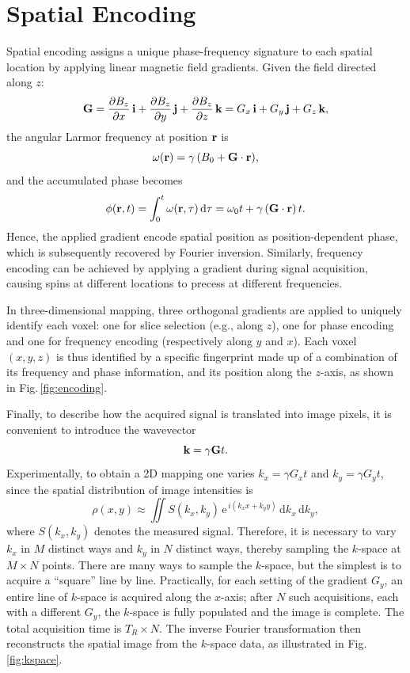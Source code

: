 \section{Spatial Encoding}
Spatial encoding assigns a unique phase-frequency signature to each spatial location by applying linear magnetic field gradients. Given the field  directed along $z$:
\begin{equation}
    \mathbf{G} = \frac{\partial B_z}{\partial x}\,\mathbf{i} + \frac{\partial B_z}{\partial y}\,\mathbf{j} + \frac{\partial B_z}{\partial z}\,\mathbf{k} = G_x\,\mathbf{i}+G_y\,\mathbf{j}+G_z\,\mathbf{k},
\end{equation}
the angular Larmor frequency at position $\mathbf{r}$ is
\begin{equation}
    \omega(\vect{r})=\gamma\,\left(B_0+\vect{G}\cdot\vect{r}\right),
\end{equation}
and the accumulated phase becomes
\begin{equation}
    \phi(\vect{r},t)=\int_0^t \omega(\vect{r},\tau)\,\mathrm{d}\tau=\omega_0 t+\gamma\,\left(\vect{G}\cdot\vect{r}\right)\,t.
\end{equation}
Hence, the applied gradient encode spatial position as position-dependent phase, which is subsequently recovered by Fourier inversion. Similarly, frequency encoding can be achieved by applying a gradient during signal acquisition, causing spins at different locations to precess at different frequencies.

In three-dimensional mapping, three orthogonal gradients are applied to uniquely identify each voxel: one for slice selection (e.g., along $z$), one for phase encoding and one for frequency encoding (respectively along $y$ and $x$). Each voxel $(x,y,z)$ is thus identified by a specific fingerprint made up of a combination of its frequency and phase information, and its position along the $z$-axis, as shown in Fig.\,\ref{fig:encoding}.

Finally, to describe how the acquired signal is translated into image pixels, it is convenient to introduce the wavevector
\begin{equation}
  \mathbf{k} = \gamma\mathbf{G}t.
\end{equation}
Experimentally, to obtain a 2D mapping one varies $k_x=\gamma G_x t$ and $k_y=\gamma G_y t$, since the spatial distribution of image intensities is
\begin{equation}
  \rho(x,y) \approx \iint S(k_x,k_y)\,\mathrm{e}^{\,i(k_x x + k_y y)}\,\mathrm{d}k_x\,\mathrm{d}k_y,
\end{equation}
where $S(k_x,k_y)$ denotes the measured signal. Therefore, it is necessary to vary $k_x$ in $M$ distinct ways and $k_y$ in $N$ distinct ways, thereby sampling the $k$-space at $M\times N$ points. There are many ways to sample the $k$-space, but the simplest is to acquire a \enquote{square} line by line. Practically, for each setting of the gradient $G_y$, an entire line of $k$-space is acquired along the $x$-axis; after $N$ such acquisitions, each with a different $G_y$, the $k$-space is fully populated and the image is complete. The total acquisition time is $T_R \times N$. The inverse Fourier transformation then reconstructs the spatial image from the $k$-space data, as illustrated in Fig.\,\ref{fig:kspace}.

